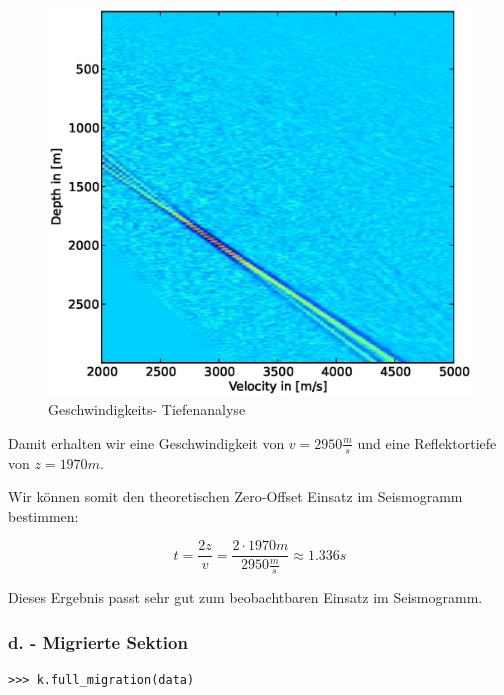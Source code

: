 \documentclass[12pt,a4paper]{scrartcl}
\begin{document}
\begin{figure}[htb]
\centering
\includegraphics[width=1\textwidth]{v_analysis}
\caption{Geschwindigkeits- Tiefenanalyse}
\label{v_analysis}
\end{figure}

Damit erhalten wir eine Geschwindigkeit von $v = 2950 \frac{m}{s}$ und eine Reflektortiefe von $z=1970 m$.

Wir können somit den theoretischen Zero-Offset Einsatz im Seismogramm bestimmen:

\begin{equation}
	t = \frac{2z}{v} = \frac{2\cdot 1970m}{2950\frac{m}{s}} \approx 1.336s
\end{equation}

Dieses Ergebnis passt sehr gut zum beobachtbaren Einsatz im Seismogramm.


\clearpage
\subsubsection*{d. - Migrierte Sektion}

\begin{verbatim}
>>> k.full_migration(data)
\end{verbatim}
\end{document}
